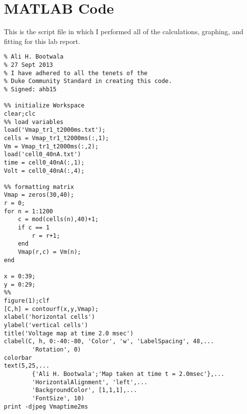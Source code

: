 \documentclass[10pt, titlepage]{article}
\begin{document}
\section{MATLAB Code}
This is the script file in which I performed all of the calculations, graphing, and fitting for this lab report.
\vspace{0.5cm}
\small{
\begin{lstlisting}[caption={\tt Bootwala\_Report2\_maker.m}]
% BME512Lab2 
% Ali H. Bootwala
% 27 Sept 2013
% I have adhered to all the tenets of the 
% Duke Community Standard in creating this code.
% Signed: ahb15

%% initialize Workspace
clear;clc
%% load variables
load('Vmap_tr1_t2000ms.txt');
cells = Vmap_tr1_t2000ms(:,1);
Vm = Vmap_tr1_t2000ms(:,2);
load('cell0_40nA.txt')
time = cell0_40nA(:,1);
Volt = cell0_40nA(:,4);

%% formatting matrix
Vmap = zeros(30,40);
r = 0;
for n = 1:1200
    c = mod(cells(n),40)+1;
    if c == 1
        r = r+1;
    end
    Vmap(r,c) = Vm(n);
end

x = 0:39;
y = 0:29;
%%
figure(1);clf
[C,h] = contourf(x,y,Vmap);
xlabel('horizontal cells')
ylabel('vertical cells')
title('Voltage map at time 2.0 msec')
clabel(C, h, 0:-40:-80, 'Color', 'w', 'LabelSpacing', 48,...
        'Rotation', 0)
colorbar
text(5,25,...
        {'Ali H. Bootwala';'Map taken at time t = 2.0msec'},...
        'HorizontalAlignment', 'left',...
        'BackgroundColor', [1,1,1],...
        'FontSize', 10)
print -djpeg Vmaptime2ms


\end{lstlisting}}
\end{document}
